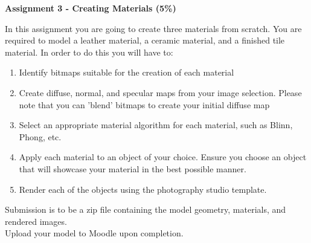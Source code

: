 
	
\begin{flushleft}
\Large\textbf{Assignment 3 - Creating Materials (5\%)}\\
\end{flushleft}

In this assignment you are going to create three materials from scratch.  You are required to model a leather material, a ceramic material, and a finished tile material.  In order to do this you will have to:
\begin{enumerate}
	\item Identify bitmaps suitable for the creation of each material
	\item Create diffuse, normal, and specular maps from your image selection.  Please note that you can 'blend' bitmaps to create your initial diffuse map
	\item Select an appropriate material algorithm for each material, such as Blinn, Phong, etc.
	\item Apply each material to an object of your choice.  Ensure you choose an object that will showcase your material in the best possible manner.
	\item Render each of the objects using the photography studio template.
\end{enumerate}

Submission is to be a zip file containing the model geometry, materials, and rendered images.\\

Upload your model to Moodle upon completion.





